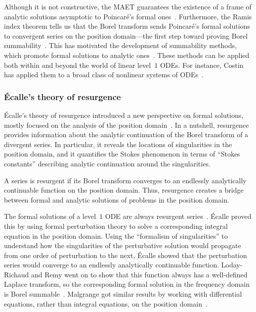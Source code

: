 \documentclass[10pt,a4paper]{amsart}
\numberwithin{equation}{section}
\begin{document}
Although it is not constructive, the MAET guarantees the existence of a frame of analytic solutions asymptotic to Poincar\'e's formal ones~\cite[Chapter~14]{balser}. Furthermore, the Ramis index theorem tells us that the Borel transform sends Poincar\'e's formal solutions to convergent series on the position domain---the first step toward proving Borel summability~\cite{ramis_index}. This has motivated the development of summability methods, which promote formal solutions to analytic ones~\cite{diverg-resurg--ii,malgrange--fourier,malgrange1995sommation,malgrange92,ramis1991series}. These methods can be applied both within and beyond the world of linear level~$1$ ODEs. For instance, Costin has applied them to a broad class of nonlinear systems of ODEs~\cite{Costin:borel-sum-non-linear}.
%
\subsubsection{\'{E}calle's theory of resurgence}
%
\'{E}calle's theory of resurgence introduced a new perspective on formal solutions, mostly focused on the analysis of the position domain~\cite{EcalleIII,loday-Remy2011}. In a nutshell, resurgence provides information about the analytic continuation of the Borel transform of a divergent series. In particular, it reveals the locations of singularities in the position domain, and it quantifies the Stokes phenomenon in terms of ``Stokes constants'' describing analytic continuation around the singularities.

A series is resurgent if its Borel transform converges to an endlessly analytically continuable function on the position domain. Thus, resurgence creates a bridge between formal and analytic solutions of problems in the position domain.

The formal solutions of a level~$1$ ODE are always resurgent series~\cite[Proposition~2.2.1]{EcalleIII}. \'{E}calle proved this by using formal perturbation theory to solve a corresponding integral equation in the position domain. Using the ``formalism of singularities'' to understand how the singularities of the perturbative solution would propagate from one order of perturbation to the next, \'{E}calle showed that the perturbation series would converge to an endlessly analytically continuable function. Loday-Richaud and Remy went on to show that this function always has a well-defined Laplace transform, so the corresponding formal solution in the frequency domain is Borel summable~\cite{loday-Remy2011}. Malgrange got similar results by working with differential equations, rather than integral equations, on the position domain~\cite{malgrange--fourier}.
\end{document}
